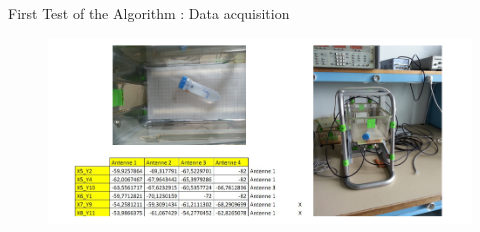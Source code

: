 \documentclass[utf8,compress]{beamer}
\begin{document}
\begin{frame}[containsverbatim]{First Test of the Algorithm : Data acquisition}
    \begin{figure}[h]
        \includegraphics[width=1.1\textwidth]{cage.png}
    \end{figure}
\end{frame}


%
%
%
%
%
\end{document}

